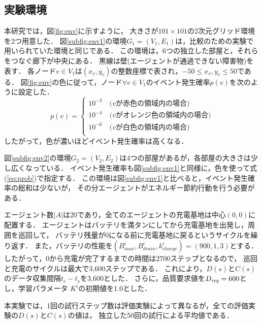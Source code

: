 \documentclass[12pt,a4j,twoside]{jarticle}
\def\AgentSet{A}
\def\Dreq{{D_{\it req}}}
\begin{document}
  \subsection{実験環境}
  本研究では，図\ref{fig:env}に示すように，
  大きさが$101 \times 101$の2次元グリッド環境を2つ用意した．
  図\ref{subfig:env1}の環境$G_1=(V_1, E_1)$は，比較のため\cite{Wu2019}の実験で用いられていた環境と同じである．
  この環境は，6つの独立した部屋と，それらをつなぐ廊下が中央にある．
  黒線は壁(エージェントが通過できない障害物)を表す．
  各ノード$v \in V_1$は$(x_v, y_v)$の整数座標で表され，$-50 \leq x_v,y_v \leq 50$である．
  図\ref{fig:env}の色に従って，ノード$\forall v\in V_1$のイベント発生確率$p(v)$を次のように設定した．
  \begin{equation}
    p(v) = 
    \begin{cases}
      10^{-3}\ & \textrm{($v$が赤色の領域内の場合)}\\
      10^{-4}\ & \textrm{($v$がオレンジ色の領域内の場合)}\\
      10^{-6}\ & \textrm{($v$が白色の領域内の場合)}\\
    \end{cases}
    \label{eq:prob}
  \end{equation}
  したがって，色が濃いほどイベント発生確率は高くなる．
  \par

  図\ref{subfig:env2}の環境$G_2=(V_2, E_2)$は4つの部屋があるが，各部屋の大きさは少し広くなっている．
  イベント発生確率も図\ref{subfig:env1}と同様に，色を使って式(\ref{eq:prob})で指定する．
  この環境は図\ref{subfig:env1}と比べると，イベント発生確率の総和は少ないが，
  その分エージェントがエネルギー節約行動を行う必要がある．
  \par
  
  エージェント数$\vert \AgentSet \vert$は20であり，全てのエージェントの充電基地は中心$(0, 0)$に配置する．
  エージェントはバッテリを満タンにしてから充電基地を出発し，周囲を巡回して，
  バッテリ残量が0になる前に充電基地に戻るというサイクルを繰り返す．
  また，バッテリの性能を$(B^i_{max}, B^i_{drain}, k^i_{charge}) = (900, 1, 3)$とする．
  したがって，0から充電が完了するまでの時間は2700ステップとなるので，
  巡回と充電のサイクルは最大で3,600ステップである．
  これにより，$D(s)$と$C(s)$のデータ収集間隔$t_e - t_s$を3,600とした．
  さらに，品質要求値を$\Dreq=600$とし，学習パラメータ $K^i$の初期値を1.0とした．
  \par

  本実験では，1回の試行ステップ数は評価実験によって異なるが，全ての評価実験の$D(s)$と$C(s)$の値は，
  独立した50回の試行による平均値である．
\end{document}
